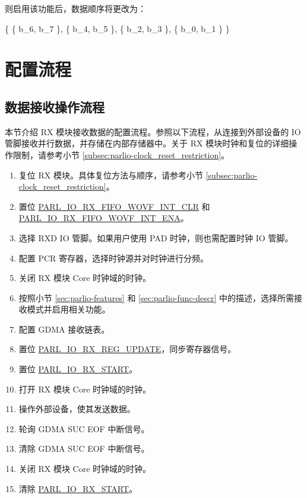 \documentclass[main\_\_CN.tex]{subfiles}
\begin{document}
则启用该功能后，数据顺序将更改为：

\begin{center}
\{ \{ b\_{6}, b\_{7} \}, \{ b\_{4}, b\_{5} \}, \{ b\_{2}, b\_{3} \}, \{ b\_{0}, b\_{1} \} \}
\end{center}


\section{配置流程}
\label{sec:parlio-prog-procedures}

\subsection{数据接收操作流程}

本节介绍 RX 模块接收数据的配置流程。参照以下流程，从连接到外部设备的 IO 管脚接收并行数据，并存储在内部存储器中。关于 RX 模块时钟和复位的详细操作限制，请参考小节 \ref{subsec:parlio-clock_reset_restriction}。

\begin{enumerate}
    \item 复位 RX 模块。具体复位方法与顺序，请参考小节 \ref{subsec:parlio-clock_reset_restriction}。
    \item 置位 \hyperref[fielddesc:PARLIORXFIFOWOVFINTCLR]{PARL\_IO\_RX\_FIFO\_WOVF\_INT\_CLR} 和 \hyperref[fielddesc:PARLIORXFIFOWOVFINTENA]{PARL\_IO\_RX\_FIFO\_WOVF\_INT\_ENA}。
    \item 选择 RXD IO 管脚。如果用户使用 PAD 时钟，则也需配置时钟 IO 管脚。
    \item 配置 PCR 寄存器，选择时钟源并对时钟进行分频。
    \item 关闭 RX 模块 Core 时钟域的时钟。
    \item 按照小节 \ref{sec:parlio-features} 和 \ref{sec:parlio-func-descr} 中的描述，选择所需接收模式并启用相关功能。
    \item 配置 GDMA 接收链表。
    \item 置位 \hyperref[fielddesc:PARLIORXREGUPDATE]{PARL\_IO\_RX\_REG\_UPDATE}，同步寄存器信号。
    \item 置位 \hyperref[fielddesc:PARLIORXSTART]{PARL\_IO\_RX\_START}。
    \item 打开 RX 模块 Core 时钟域的时钟。
    \item 操作外部设备，使其发送数据。
    \item 轮询 GDMA SUC EOF 中断信号。
    \item 清除 GDMA SUC EOF 中断信号。
    \item 关闭 RX 模块 Core 时钟域的时钟。
    \item 清除 \hyperref[fielddesc:PARLIORXSTART]{PARL\_IO\_RX\_START}。
\end{enumerate}
\end{document}
